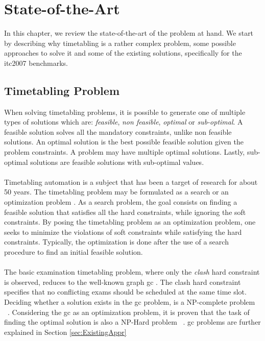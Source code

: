 \chapter{State-of-the-Art}
\label{chap:stateofart}
\thispagestyle{plain}

In this chapter, we review the state-of-the-art of the problem at hand. We start by describing why timetabling is a rather complex problem, some possible approaches to solve it and some of the existing solutions, specifically for the \gls{itc2007} benchmarks.\\

\section{Timetabling Problem}

When solving timetabling problems, it is possible to generate one of multiple types of solutions which are: \textit{feasible}, \textit{non feasible}, \textit{optimal} or \textit{sub-optimal}. A feasible solution solves all the mandatory constraints, unlike non feasible solutions. An optimal solution is the best possible feasible solution given the problem constraints. A problem may have multiple optimal solutions. Lastly, sub-optimal solutions are feasible solutions with sub-optimal values.\\
\\
Timetabling automation is a subject that has been a target of research for about 50 years. The timetabling problem may be formulated as a search or an optimization problem \cite{Schaerf1999}. As a search problem, the goal consists on finding a feasible solution that satisfies all the hard constraints, while ignoring the soft constraints. By posing the timetabling problem as an optimization problem, one seeks to minimize the violations of soft constraints while satisfying the hard constraints. Typically, the optimization is done after the use of a search procedure to find an initial feasible solution.\\
\\
The basic examination timetabling problem, where only the \textit{clash} hard constraint is observed, reduces to the well-known graph \gls{gc} \cite{Jensen2001}. The clash hard constraint specifies that no conflicting exams should be scheduled at the same time slot. Deciding whether a solution exists in the \gls{gc} problem, is a NP-complete  problem \cite{Arora2009}~\cite{Qu2009}. Considering the \gls{gc} as an optimization problem, it is proven that the task of finding the optimal solution is also a NP-Hard  problem \cite{Arora2009}~\cite{Qu2009}. \gls{gc} problems are further explained in Section \ref{sec:ExistingAppr}
\\
